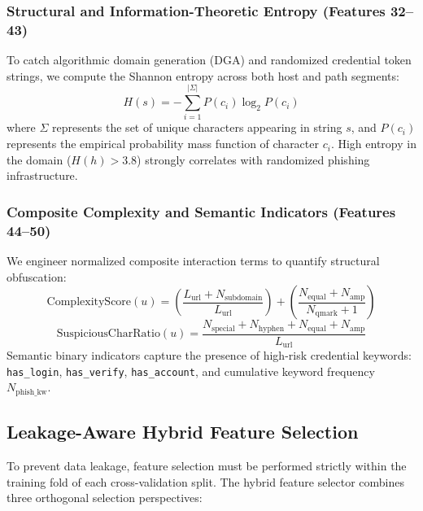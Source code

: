 \documentclass[journal]{IEEEtran}
\begin{document}
\subsubsection{Structural and Information-Theoretic Entropy (Features 32--43)}
To catch algorithmic domain generation (DGA) and randomized credential token strings, we compute the Shannon entropy across both host and path segments:
\begin{equation}
H(s) = -\sum_{i=1}^{|\Sigma|} P(c_i) \log_2 P(c_i)
\end{equation}
where $\Sigma$ represents the set of unique characters appearing in string $s$, and $P(c_i)$ represents the empirical probability mass function of character $c_i$. High entropy in the domain ($H(h) > 3.8$) strongly correlates with randomized phishing infrastructure.

\subsubsection{Composite Complexity and Semantic Indicators (Features 44--50)}
We engineer normalized composite interaction terms to quantify structural obfuscation:
\begin{equation}
\text{ComplexityScore}(u) = \left( \frac{L_{\text{url}} + N_{\text{subdomain}}}{L_{\text{url}}} \right) + \left( \frac{N_{\text{equal}} + N_{\text{amp}}}{N_{\text{qmark}} + 1} \right)
\end{equation}
\begin{equation}
\text{SuspiciousCharRatio}(u) = \frac{N_{\text{special}} + N_{\text{hyphen}} + N_{\text{equal}} + N_{\text{amp}}}{L_{\text{url}}}
\end{equation}
Semantic binary indicators capture the presence of high-risk credential keywords: \texttt{has\_login}, \texttt{has\_verify}, \texttt{has\_account}, and cumulative keyword frequency $N_{\text{phish\_kw}}$.

\subsection{Leakage-Aware Hybrid Feature Selection}
To prevent data leakage, feature selection must be performed strictly within the training fold of each cross-validation split. The hybrid feature selector combines three orthogonal selection perspectives:
\end{document}
